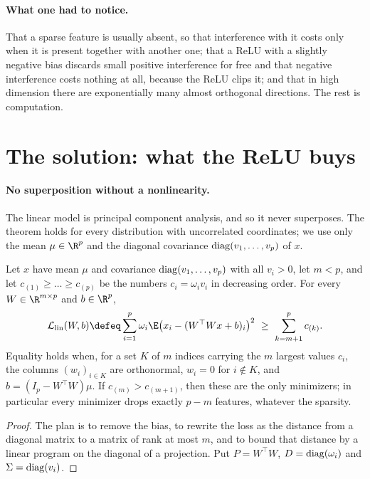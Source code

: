 \begin{refsection}
\paragraph{What one had to notice.} That a sparse feature is usually absent, so that interference with it costs only when it is present together with another one; that a ReLU with a slightly negative bias discards small positive interference for free and that negative interference costs nothing at all, because the ReLU clips it; and that in high dimension there are exponentially many almost orthogonal directions. The rest is computation.

\section{The solution: what the ReLU buys}\label{sec:superposition:two}

\paragraph{No superposition without a nonlinearity.} The linear model is principal component analysis, and so it never superposes. The theorem holds for every distribution with uncorrelated coordinates; we use only the mean $\mu\in\R^p$ and the diagonal covariance $\operatorname{diag}(v_1,\dots,v_p)$ of $x$.

\begin{theorem}\label{thm:superposition:linear}
Let $x$ have mean $\mu$ and covariance $\operatorname{diag}(v_1,\dots,v_p)$ with all $v_i>0$, let $m<p$, and let $c_{(1)}\ge\dots\ge c_{(p)}$ be the numbers $c_i=\omega_iv_i$ in decreasing order. For every $W\in\R^{m\times p}$ and $b\in\R^p$,
\[
  \Loss_{\mathrm{lin}}(W,b)\defeq\sum_{i=1}^p\omega_i\E\bigl(x_i-(W^\top Wx+b)_i\bigr)^2\ \ge\ \sum_{k=m+1}^pc_{(k)} .
\]
Equality holds when, for a set $K$ of $m$ indices carrying the $m$ largest values $c_i$, the columns $(w_i)_{i\in K}$ are orthonormal, $w_i=0$ for $i\notin K$, and $b=(I_p-W^\top W)\mu$. If $c_{(m)}>c_{(m+1)}$, then these are the only minimizers; in particular every minimizer drops exactly $p-m$ features, whatever the sparsity.
\end{theorem}

\begin{proof}
The plan is to remove the bias, to rewrite the loss as the distance from a diagonal matrix to a matrix of rank at most $m$, and to bound that distance by a linear program on the diagonal of a projection. Put $P=W^\top W$, $D=\operatorname{diag}(\omega_i)$ and $\Sigma=\operatorname{diag}(v_i)$.


\end{proof}
\end{refsection}
